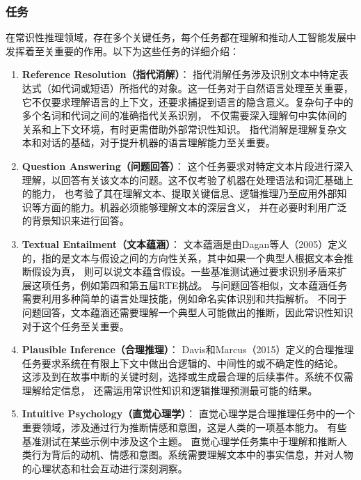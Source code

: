 \subsubsection{任务}
\label{sec1:task}


在常识性推理领域，存在多个关键任务\cite{storks2019recent}，每个任务都在理解和推动人工智能发展中发挥着至关重要的作用。以下为这些任务的详细介绍：
\begin{enumerate}
  \item \textbf{Reference Resolution（指代消解）}：
  指代消解任务涉及识别文本中特定表达式（如代词或短语）所指代的对象。这一任务对于自然语言处理至关重要，它不仅要求理解语言的上下文，还要求捕捉到语言的隐含意义。复杂句子中的多个名词和代词之间的准确指代关系识别，
  不仅需要深入理解句中实体间的关系和上下文环境，有时更需借助外部常识性知识\cite{morgenstern2016planning,davis2017first}。
  指代消解是理解复杂文本和对话的基础，对于提升机器的语言理解能力至关重要。

  \item \textbf{Question Answering（问题回答）}：
  这个任务要求对特定文本片段进行深入理解，以回答有关该文本的问题。这不仅考验了机器在处理语法和词汇基础上的能力，
  也考验了其在理解文本、提取关键信息、逻辑推理乃至应用外部知识等方面的能力。机器必须能够理解文本的深层含义，
  并在必要时利用广泛的背景知识来进行回答。

  \item \textbf{Textual Entailment（文本蕴涵）}：
  文本蕴涵是由Dagan等人（2005）\cite{dagan2005pascal}定义的，指的是文本与假设之间的方向性关系，其中如果一个典型人根据文本会推断假设为真，
  则可以说文本蕴含假设。一些基准测试通过要求识别矛盾来扩展这项任务，例如第四和第五届RTE挑战\cite{giampiccolo2008fourth,bentivogli2009fifth}。
  与问题回答相似，文本蕴涵任务需要利用多种简单的语言处理技能，例如命名实体识别和共指解析。
  不同于问题回答，文本蕴涵还需要理解一个典型人可能做出的推断，因此常识性知识对于这个任务至关重要。

  \item \textbf{Plausible Inference（合理推理）}：
  Davis和Marcus（2015）\cite{davis2015commonsense}定义的合理推理任务要求系统在有限上下文中做出合逻辑的、中间性的或不确定性的结论。
  这涉及到在故事中断的关键时刻，选择或生成最合理的后续事件。系统不仅需理解给定信息，
  还需运用常识性知识和逻辑推理预测最可能的结果。

  \item \textbf{Intuitive Psychology（直觉心理学）}：
  直觉心理学是合理推理任务中的一个重要领域，涉及通过行为推断情感和意图，这是人类的一项基本能力。
  有些基准测试在某些示例中涉及这个主题。%
  直觉心理学任务集中于理解和推断人类行为背后的动机、情感和意图。系统需要理解文本中的事实信息，并对人物的心理状态和社会互动进行深刻洞察。


\end{enumerate}
